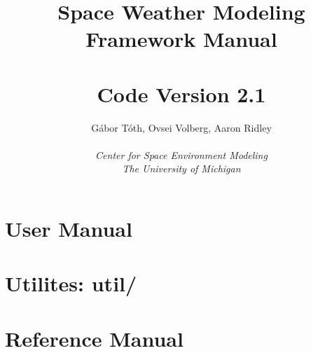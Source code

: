 \documentclass[twoside,10pt]{book}
\title{Space Weather Modeling Framework Manual \\ 
       \hfill \\
       \large Code Version 2.1}
\author{G\'abor T\'oth, Ovsei Volberg, Aaron Ridley\\
       \hfill \\
       {\it Center for Space Environment Modeling}\\
       {\it The University of Michigan}}
\begin{document}
\pagestyle{fancy}
\lhead[\fancyplain{}{\bfseries\thepage}]{\fancyplain{}{\bfseries\rightmark}}
\rhead[\fancyplain{}{\bfseries\leftmark}]{\fancyplain{}{\bfseries\thepage}}
\cfoot{}

\maketitle

\tableofcontents



\chapter{User Manual}











\chapter{Utilites: util/}



\chapter{Reference Manual}




\end{document}
